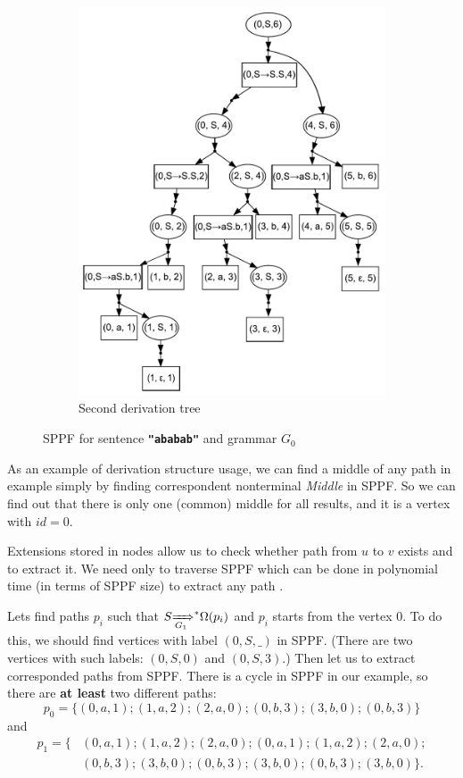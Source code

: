 \begin{figure}[ht]
\begin{center}
\begin{subfigure}[b]{0.3\textwidth}
        \includegraphics[width=\textwidth]{dot/Brackets2.pdf}
        \caption{Second derivation tree}
        \label{tree2}        
    \end{subfigure}
    \caption{SPPF for sentence \textbf{\texttt{"ababab"}} and grammar $G_0$}
    \label{sppfSample}
    \end{center}                
\end{figure}

    
As an example of derivation structure usage, we can find a middle of any path in example simply by finding correspondent nonterminal \textit{Middle} in SPPF.
So we can find out that there is only one (common) middle for all results, and it is a vertex with $id = 0$. 

Extensions stored in nodes allow us to check whether path from $u$ to $v$ exists and to extract it. 
We need only to traverse SPPF which can be done in polynomial time (in terms of SPPF size) to extract any path . 

Lets find paths $p_i$ such that $S {\xRightarrow[G_1]{}}^{*} \Omega(p_i)$ and $p_i$ starts from the vertex $0$.
To do this, we should find vertices with label $(0, S, \_)$ in SPPF.
(There are two vertices with such labels: $(0, S, 0)$ and $(0, S, 3)$.)
Then let us to extract corresponded paths from SPPF.
There is a cycle in SPPF in our example, so there are \textbf{at least} two different paths: $$p_0=\{(0,a,1);(1,a,2);(2,a,0);(0,b,3);(3,b,0);(0,b,3)\}$$ and 
\begin{align*}
p_1=\{&(0,a,1);(1,a,2);(2,a,0);(0,a,1);(1,a,2);(2,a,0);\\ &(0,b,3);(3,b,0);(0,b,3);(3,b,0);(0,b,3);(3,b,0)\}.
\end{align*}


